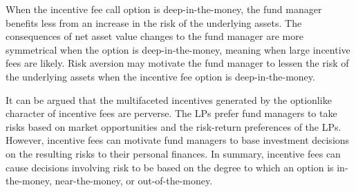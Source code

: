 \documentclass[11pt]{article}
\begin{document}
When the incentive fee call option is deep-in-the-money, the fund manager benefits less from an increase in the risk of the underlying assets. The consequences of net asset value changes to the fund manager are more symmetrical when the option is deep-in-the-money, meaning when large incentive fees are likely. Risk aversion may motivate the fund manager to lessen the risk of the underlying assets when the incentive fee option is deep-in-the-money.

It can be argued that the multifaceted incentives generated by the optionlike character of incentive fees are perverse. The LPs prefer fund managers to take risks based on market opportunities and the risk-return preferences of the LPs. However, incentive fees can motivate fund managers to base investment decisions on the resulting risks to their personal finances. In summary, incentive fees can cause decisions involving risk to be based on the degree to which an option is in-the-money, near-the-money, or out-of-the-money.
\end{document}
